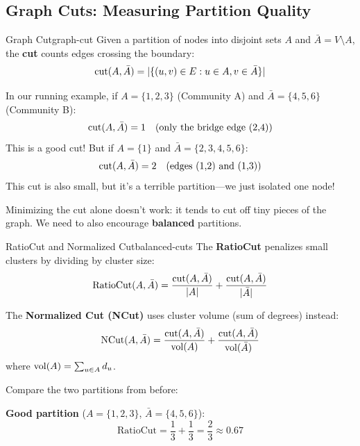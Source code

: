 \begin{notechapter}
\subsection{Graph Cuts: Measuring Partition Quality}

\begin{definition}{Graph Cut}{graph-cut}
Given a partition of nodes into disjoint sets $A$ and $\bar{A} = V \setminus A$, the \textbf{cut} counts edges crossing the boundary:
\begin{equation}
\mathrm{cut}(A, \bar{A}) = |\{(u,v) \in E : u \in A, v \in \bar{A}\}|
\end{equation}
\end{definition}

\begin{example}
In our running example, if $A = \{1, 2, 3\}$ (Community A) and $\bar{A} = \{4, 5, 6\}$ (Community B):
\[
\mathrm{cut}(A, \bar{A}) = 1 \quad \text{(only the bridge edge (2,4))}
\]
This is a good cut! But if $A = \{1\}$ and $\bar{A} = \{2,3,4,5,6\}$:
\[
\mathrm{cut}(A, \bar{A}) = 2 \quad \text{(edges (1,2) and (1,3))}
\]
This cut is also small, but it's a terrible partition---we just isolated one node!
\end{example}

\begin{keyidea}
Minimizing the cut alone doesn't work: it tends to cut off tiny pieces of the graph. We need to also encourage \textbf{balanced} partitions.
\end{keyidea}

\begin{definition}{RatioCut and Normalized Cut}{balanced-cuts}
The \textbf{RatioCut} penalizes small clusters by dividing by cluster size:
\begin{equation}
\text{RatioCut}(A, \bar{A}) = \frac{\mathrm{cut}(A, \bar{A})}{|A|} + \frac{\mathrm{cut}(A, \bar{A})}{|\bar{A}|}
\end{equation}

The \textbf{Normalized Cut (NCut)} uses cluster volume (sum of degrees) instead:
\begin{equation}
\text{NCut}(A, \bar{A}) = \frac{\mathrm{cut}(A, \bar{A})}{\mathrm{vol}(A)} + \frac{\mathrm{cut}(A, \bar{A})}{\mathrm{vol}(\bar{A})}
\end{equation}
where $\mathrm{vol}(A) = \sum_{u \in A} d_u$.
\end{definition}

\begin{example}
Compare the two partitions from before:

\textbf{Good partition} ($A = \{1,2,3\}$, $\bar{A} = \{4,5,6\}$):
\[
\text{RatioCut} = \frac{1}{3} + \frac{1}{3} = \frac{2}{3} \approx 0.67
\]


\end{example}
\end{notechapter}

